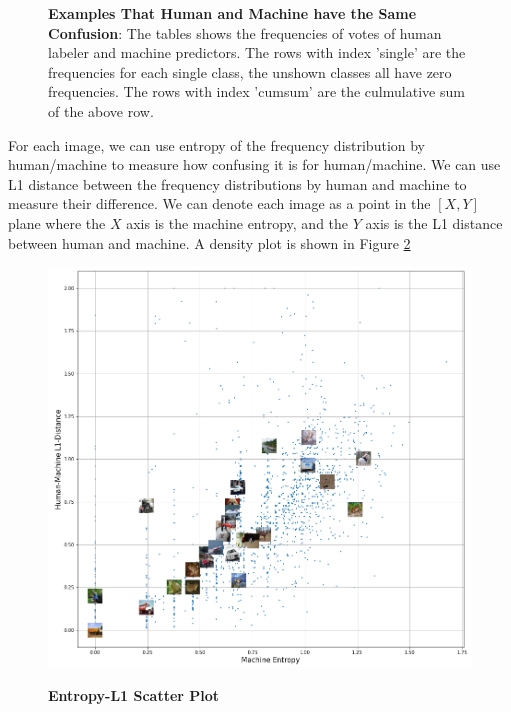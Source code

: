\documentclass{article}
\begin{document}
\begin{figure}[H]
    \caption{\textbf{Examples That Human and Machine have the Same Confusion}: The tables shows the frequencies of votes of human labeler and machine predictors. The rows with index 'single' are the frequencies for each single class, the unshown classes all have zero frequencies. The rows with index 'cumsum' are the culmulative sum of the above row.}
    \label{fig:example_prob}
\end{figure}

For each image, we can use entropy of the frequency distribution by human/machine to measure how confusing it is for human/machine. We can use L1 distance between the frequency distributions by human and machine to measure their difference. We can denote each image as a point in the $\left[X,Y\right]$ plane where the $X$ axis is the machine entropy, and the $Y$ axis is the L1 distance between human and machine. A density plot is shown in Figure \ref{l1entropyscatter}

\begin{figure}[H]
    \centering
    \includegraphics[scale=0.5]{figs/l1_entropy_scatter.png}
    \label{l1entropyscatter}
    \caption{\textbf{Entropy-L1 Scatter Plot}}
\end{figure}
\end{document}
